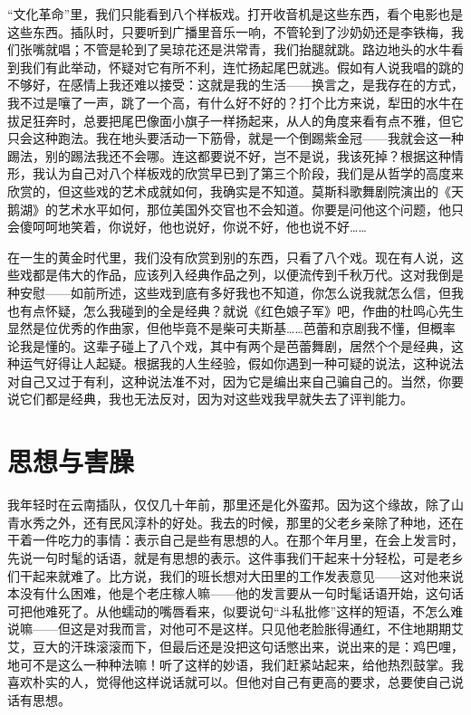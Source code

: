 “文化革命”里，我们只能看到八个样板戏。打开收音机是这些东西，看个电影也是这些东西。插队时，只要听到广播里音乐一响，不管轮到了沙奶奶还是李铁梅，我们张嘴就唱；不管是轮到了吴琼花还是洪常青，我们抬腿就跳。路边地头的水牛看到我们有此举动，怀疑对它有所不利，连忙扬起尾巴就逃。假如有人说我唱的跳的不够好，在感情上我还难以接受：这就是我的生活——换言之，是我存在的方式，我不过是嚷了一声，跳了一个高，有什么好不好的？打个比方来说，犁田的水牛在拔足狂奔时，总要把尾巴像面小旗子一样扬起来，从人的角度来看有点不雅，但它只会这种跑法。我在地头要活动一下筋骨，就是一个倒踢紫金冠——我就会这一种踢法，别的踢法我还不会哪。连这都要说不好，岂不是说，我该死掉？根据这种情形，我认为自己对八个样板戏的欣赏早已到了第三个阶段，我们是从哲学的高度来欣赏的，但这些戏的艺术成就如何，我确实是不知道。莫斯科歌舞剧院演出的《天鹅湖》的艺术水平如何，那位美国外交官也不会知道。你要是问他这个问题，他只会傻呵呵地笑着，你说好，他也说好，你说不好，他也说不好……　 

在一生的黄金时代里，我们没有欣赏到别的东西，只看了八个戏。现在有人说，这些戏都是伟大的作品，应该列入经典作品之列，以便流传到千秋万代。这对我倒是种安慰——如前所述，这些戏到底有多好我也不知道，你怎么说我就怎么信，但我也有点怀疑，怎么我碰到的全是经典？就说《红色娘子军》吧，作曲的杜鸣心先生显然是位优秀的作曲家，但他毕竟不是柴可夫斯基……芭蕾和京剧我不懂，但概率论我是懂的。这辈子碰上了八个戏，其中有两个是芭蕾舞剧，居然个个是经典，这种运气好得让人起疑。根据我的人生经验，假如你遇到一种可疑的说法，这种说法对自己又过于有利，这种说法准不对，因为它是编出来自己骗自己的。当然，你要说它们都是经典，我也无法反对，因为对这些戏我早就失去了评判能力。

\chapter{思想与害臊}

我年轻时在云南插队，仅仅几十年前，那里还是化外蛮邦。因为这个缘故，除了山青水秀之外，还有民风淳朴的好处。我去的时候，那里的父老乡亲除了种地，还在干着一件吃力的事情：表示自己是些有思想的人。在那个年月里，在会上发言时，先说一句时髦的话语，就是有思想的表示。这件事我们干起来十分轻松，可是老乡们干起来就难了。比方说，我们的班长想对大田里的工作发表意见——这对他来说本没有什么困难，他是个老庄稼人嘛——他的发言要从一句时髦话语开始，这句话可把他难死了。从他蠕动的嘴唇看来，似要说句“斗私批修”这样的短语，不怎么难说嘛——但这是对我而言，对他可不是这样。只见他老脸胀得通红，不住地期期艾艾，豆大的汗珠滚滚而下，但最后还是没把这句话憋出来，说出来的是：鸡巴哩，地可不是这么一种种法嘛！听了这样的妙语，我们赶紧站起来，给他热烈鼓掌。我喜欢朴实的人，觉得他这样说话就可以。但他对自己有更高的要求，总要使自己说话有思想。 

